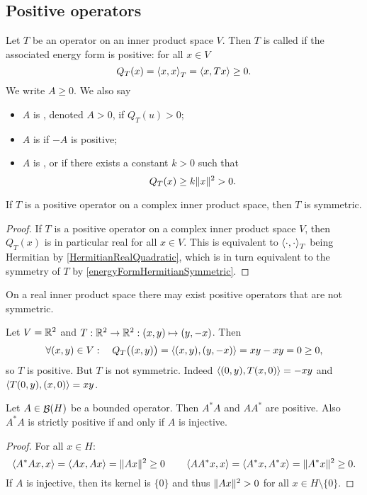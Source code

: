 \subsection{Positive operators}
\begin{definition}
Let $T$ be an operator on an inner product space $V$. Then $T$ is called  if the associated energy form is positive: for all $x\in V$
\[ Q_T(x) = \left\langle x,x \right\rangle_T = \left\langle x,Tx \right\rangle \geq 0. \]
We write $A \geq 0$. We also say
\begin{itemize}
\item $A$ is , denoted $A > 0$, if $Q_T(u) > 0$;
\item $A$ is  if $-A$ is positive;
\item $A$ is ,  or  if there exists a constant $k>0$ such that
\[ Q_T(x) \geq k\lVert x\rVert^2 > 0. \]
\end{itemize}
\end{definition}

\begin{lemma}
If $T$ is a positive operator on a complex inner product space, then $T$ is symmetric.
\end{lemma}
\begin{proof}
If $T$ is a positive operator on a complex inner product space $V$, then $Q_T(x)$ is in particular real for all $x\in V$. This is equivalent to $\left\langle \cdot,\cdot \right\rangle_T$ being Hermitian by \ref{HermitianRealQuadratic}, which is in turn equivalent to the symmetry of $T$ by \ref{energyFormHermitianSymmetric}.
\end{proof}

On a real inner product space there may exist positive operators that are not symmetric.
\begin{example}
Let $V= \mathbb{R}^2$ and $T: \mathbb{R}^2 \to\mathbb{R}^2: (x,y)\mapsto (y,-x)$. Then
\[ \forall (x,y)\in V: \quad Q_T\big((x,y)\big) = \left\langle (x,y), (y,-x) \right\rangle = xy -xy = 0 \geq 0, \]
so $T$ is positive. But $T$ is not symmetric. Indeed $\left\langle (0,y), T(x,0) \right\rangle = -xy$ and $\left\langle T(0,y), (x, 0) \right\rangle = xy$.
\end{example}

\begin{lemma}
Let $A\in\mathop{\mathcal{B}}(H)$ be a bounded operator. Then $A^*A$ and $AA^*$ are positive. Also $A^*A$ is strictly positive \textup{if and only if} $A$ is injective.
\end{lemma}
\begin{proof}
For all $x\in H$:
\[ \left\langle A^*Ax,x \right\rangle = \left\langle Ax,Ax \right\rangle = \lVert Ax\rVert^2 \geq 0 \qquad \left\langle AA^*x,x \right\rangle = \left\langle A^*x,A^*x \right\rangle = \lVert A^*x\rVert^2 \geq 0. \]
If $A$ is injective, then its kernel is $\{0\}$ and thus $\lVert Ax\rVert^2 > 0$ for all $x\in H\setminus\{0\}$.
\end{proof}

